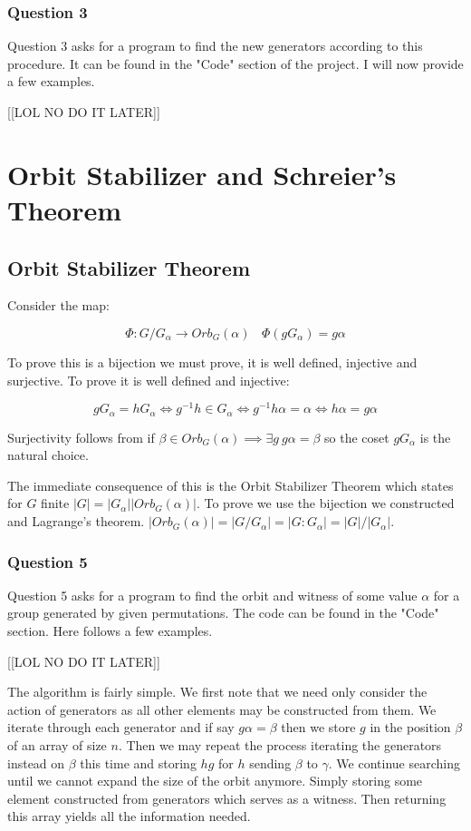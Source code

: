 \documentclass{article}
\begin{document}
\subsubsection{Question 3}
Question 3 asks for a program to find the new generators according to this procedure. It can be found in the "Code" section of the project.
I will now provide a few examples.

	[[LOL NO DO IT LATER]]

\section{Orbit Stabilizer and Schreier's Theorem}
\subsection{Orbit Stabilizer Theorem}
Consider the map:

$$\Phi: G/G_{\alpha} \rightarrow Orb_{G}(\alpha)\ \ \ \ \Phi(gG_{\alpha}) = g\alpha$$

To prove this is a bijection we must prove, it is well defined, injective and surjective.
To prove it is well defined and injective:

$$gG_\alpha = hG_\alpha \iff g^{-1}h \in G_\alpha \iff g^{-1}h\alpha = \alpha \iff h\alpha = g\alpha$$

Surjectivity follows from if $\beta \in Orb_G(\alpha) \implies \exists g\ g\alpha = \beta$ so the coset $gG_\alpha$ is the natural choice.

\vspace*{5mm}

The immediate consequence of this is the Orbit Stabilizer Theorem which states for $G$ finite $|G| = |G_\alpha| |Orb_G(\alpha)|$. To prove we use the bijection we constructed
and Lagrange's theorem.
$|Orb_G(\alpha)| = |G/G_\alpha| = |G: G_\alpha| = |G| / |G_\alpha|$.

\subsubsection{Question 5}
Question 5 asks for a program to find the orbit and witness of some value $\alpha$ for a group generated by given permutations.
The code can be found in the "Code" section. Here follows a few examples.

	[[LOL NO DO IT LATER]]

The algorithm is fairly simple. We first note that we need only consider the action of generators as all other elements may be constructed from them.
We iterate through each generator and if say $g\alpha = \beta$ then we store $g$ in the position $\beta$ of an array of size $n$. Then we may repeat the process iterating the generators instead on $\beta$ this time and storing $hg$ for $h$ sending $\beta$ to $\gamma$.
We continue searching until we cannot expand the size of the orbit anymore. Simply storing some element constructed from generators which serves as a witness.
Then returning this array yields all the information needed.
\end{document}
